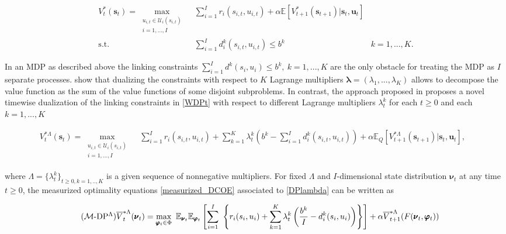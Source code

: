 \documentclass[12pt,a4paper]{article}
\newcommand{\bvarphi}{\pmb{\varphi}}
\newcommand{\bnu}{\pmb{\nu}}
\newcommand{\bu}{\mathbf{u}}
\newcommand{\bs}{\mathbf{s}}
\newcommand{\mU}{\mathcal{U}}
\newcommand{\mM}{\mathcal{M}}
\newcommand{\oV}{\overline{V}}
\newcommand{\blambda}{\pmb{\lambda}}
\begin{document}
		
		\begin{align}
			V^*_t(\bs_t)=\max_{\substack{u_{i,t} \in \mU_i(s_{i,t})\\ i=1,...,I}}  & \ \sum_{i=1}^I r_i(s_{i,t},u_{i,t}) +\alpha \mathbb{E} [V^*_{t+1}(\bs_{t+1})|\bs_t,\bu_t] & \tag{WDP$_t$} \label{WDPt}\\
			\mbox{s.t.} & \ \sum_{i=1}^I d_i^k(s_{i,t},u_{i,t}) \leq b^k & k=1,...,K. \nonumber
		\end{align}
		
		
		
		In an MDP as described above the linking constraints $\sum_{i=1}^I d^k(s_i,u_i) \leq b^k, \ k=1,...,K$ are the only obstacle for treating the MDP as $I$ separate processes. \cite{adelman_weakly} show that dualizing the constraints with respect to $K$ Lagrange multipliers $\blambda=(\lambda_1,...,\lambda_K)$ allows to decompose the value function as the sum of the value functions of some disjoint subproblems. In contrast, the approach proposed in \cite{measurizedWMDP} proposes a novel timewise dualization of the linking constraints in \eqref{WDPt} with respect to different Lagrange multipliers $\lambda_t^k$ for each $t \geq 0$ and each $k=1,...,K$
		
		\begin{align}
			V_t^{*\Lambda}(\bs_t)=\max_{\substack{u_{i,t} \in \mU_i(s_{i,t})\\ i=1,...,I}}  & \ \sum_{i=1}^I r_i(s_{i,t},u_{i,t}) + \sum_{k=1}^K \lambda_t^k \left(b^k -\sum_{i=1}^I d_i^k(s_{i,t},u_{i,t})  \right) +\alpha \mathbb{E}_{Q} [V_{t+1}^{*\Lambda} (\bs_{t+1})| \bs_t, \bu_t], & \tag{DP$^\Lambda$} \label{DPlambda}
		\end{align}
		
		\noindent where $\Lambda=\{ \lambda_t^k\}_{t \geq 0, k=1,..,K}$ is a given sequence of nonnegative multipliers. For fixed $\Lambda$ and $I$-dimensional state distribution $\bnu_t$ at any time $t\geq 0$, the measurized optimality equations \eqref{measurized_DCOE} associated to \eqref{DPlambda} can be written as
		
		
		
		\begin{align} \label{measurized_DPlambda}\tag{$\mM$-DP$^\Lambda$}
			\oV_{t}^{*\Lambda}(\bnu_t)& =\max_{\substack{\bvarphi_{t} \in \Phi  }}  \  \mathbb{E}_{\bnu_{t}} \mathbb{E}_{\bvarphi_{t}} \left[  \sum_{i=1}^I \  \left\{r_i(s_{i},u_{i}) + \sum_{k=1}^K \lambda_t^k \left( \frac{b^k}{I}-d_i^k(s_{i},u_{i})  \right) \right\}\right]  +\alpha \oV_{t+1}^{*\Lambda}(F(\bnu_t,\bvarphi_t))
		\end{align}
		
\end{document}
